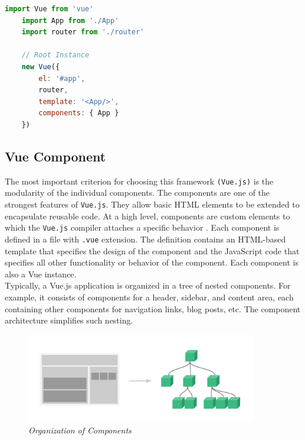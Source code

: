 \begin{lstlisting}[language=JavaScript, caption=main.js]
    import Vue from 'vue'
    import App from './App'
    import router from './router'

    // Root Instance
    new Vue({
        el: '#app',
        router,
        template: '<App/>',
        components: { App }
    })

\end{lstlisting}

\subsection{Vue Component}
\label{Vue:Component}
The most important criterion for choosing this framework \texttt{(Vue.js)} is the modularity of the individual components. The components are one of the strongest features of \texttt{Vue.js}. They allow basic HTML elements to be extended to encapsulate reusable code. At a high level, components are custom elements to which the \texttt{Vue.js} compiler attaches a specific behavior \cite{Vue019:Intro:Online}. Each component is defined in a file with \texttt{.vue} extension. The definition contains an HTML-based template that specifies the design of the component and the JavaScript code that specifies all other functionality or behavior of the component. Each component is also a Vue instance.\\

Typically, a Vue.js application is organized in a tree of nested components. For example, it consists of components for a header, sidebar, and content area, each containing other components for navigation links, blog posts, etc. The component architecture simplifies such nesting.

\begin{figure}[H]
  \centering
  \includegraphics[width=0.9\textwidth]{Bilder/img/components.png}  
  \caption{ \textit{Organization of Components} \cite{VueComponents:Online}}%
\label{fig:OrganisationvonKomponenten}
\end{figure}

